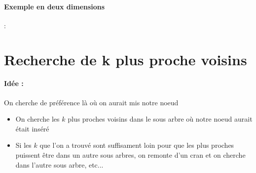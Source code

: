 \paragraph{Exemple en deux dimensions} :\\

\section*{Recherche de k plus proche voisins}

\paragraph{Idée :} On cherche de préférence là où on aurait mis notre noeud
\begin{itemize}[label=$\star$]
	\item On cherche les $k$ plus proches voisins dans le sous arbre où notre noeud aurait était inséré
	\item Si les $k$ que l'on a trouvé sont suffisament loin pour que les plus proches puissent être dans un autre sous arbres, on remonte d'un cran et on cherche dans l'autre sous arbre, etc...	
\end{itemize}

